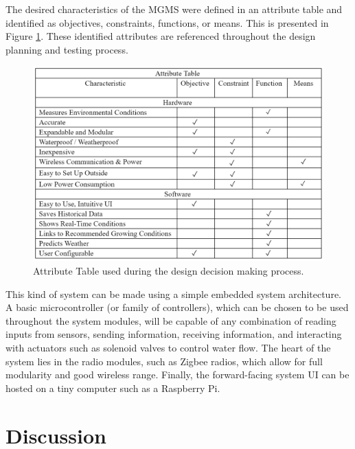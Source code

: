\documentclass{report}
\begin{document}
The desired characteristics of the MGMS were defined in an attribute table and identified as objectives, constraints, functions, or means. This is presented in Figure \ref{fig:Attribute}. These identified attributes are referenced throughout the design planning and testing process.
\begin{figure}[H] %
    \centering
    \includegraphics{PNGs/AttributeTable.PNG}
    \caption{Attribute Table used during the design decision making process.}
    \label{fig:Attribute}
\end{figure}
This kind of system can be made using a simple embedded system architecture. A basic microcontroller (or family of controllers), which can be chosen to be used throughout the system modules, will be capable of any combination of reading inputs from sensors, sending information, receiving information, and interacting with actuators such as solenoid valves to control water flow. The heart of the system lies in the radio modules, such as Zigbee radios, which allow for full modularity and good wireless range. Finally, the forward-facing system UI can be hosted on a tiny computer such as a Raspberry Pi.\\

\chapter{Discussion}
\end{document}
